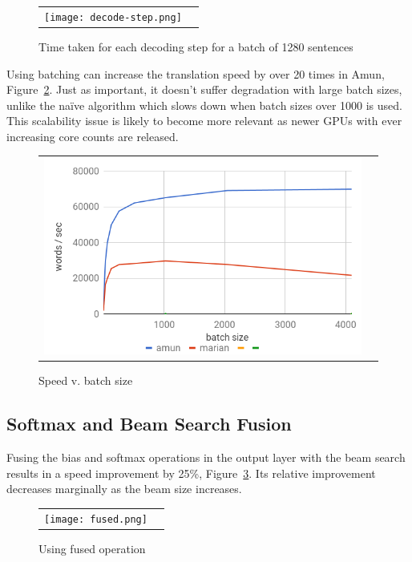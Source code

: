 \documentclass[11pt,a4paper]{article}
\begin{document}
\begin{figure}
\centering
\begin{tabular}{cc}
{\texttt{[image: decode-step.png]}} 
\end{tabular}
\caption{Time taken for each decoding step for a batch of 1280 sentences}
\label{fig:decode-step}
\end{figure} 

Using batching can increase the translation speed by over 20 times in Amun, Figure~\ref{fig:batch-size}. Just as important, it doesn't suffer degradation with large batch sizes, unlike the na\"ive algorithm which slows down when batch sizes over 1000 is used. This scalability issue is likely to become more relevant as newer GPUs with ever increasing core counts are released.


\begin{figure}
\centering
\begin{tabular}{cc}
{\includegraphics[scale=0.3]{batch-size.png}} 
\end{tabular}
\caption{Speed v. batch size}
\label{fig:batch-size}
\end{figure} 


\subsection{Softmax and Beam Search Fusion}

Fusing the bias and softmax operations in the output layer with the beam search results in a speed improvement by 25\%, Figure~\ref{fig:fused}. Its relative improvement decreases marginally as the beam size increases.

\begin{figure}
\centering
\begin{tabular}{cc}
{\texttt{[image: fused.png]}} 
\end{tabular}
\caption{Using fused operation}
\label{fig:fused}
\end{figure} 
\end{document}
